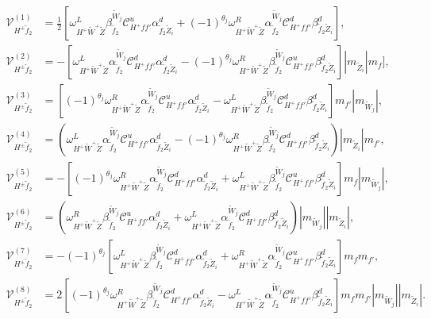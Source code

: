 \documentclass[final,3p,times]{elsarticle}
\begin{document}
\begin{align}
\mathcal{V}_{H^{\pm} \tilde{f}_2}^{(1)} &= \frac{1}{2}[\omega_{H^+ \tilde{W}^+ \tilde{Z}}^L \beta_{\tilde{f}_2}^{\tilde{W}_j} \mathcal{C}_{H^+ f f'}^u \alpha_{\tilde{f}_2 \tilde{Z}_i}^{d} + (-1)^{\theta_j} \omega_{H^+ \tilde{W}^+ \tilde{Z}}^R \alpha_{\tilde{f}_2}^{\tilde{W}_j} \mathcal{C}_{H^+ f f'}^d \beta_{\tilde{f}_2 \tilde{Z}_i}^{d}], \\
\mathcal{V}_{H^{\pm} \tilde{f}_2}^{(2)} &= -[\omega_{H^+ \tilde{W}^+ \tilde{Z}}^L \alpha_{\tilde{f}_2}^{\tilde{W}_j} \mathcal{C}_{H^+ f f'}^d \alpha_{\tilde{f}_2 \tilde{Z}_i}^{d} - (-1)^{\theta_j} \omega_{H^+ \tilde{W}^+ \tilde{Z}}^R \beta_{\tilde{f}_2}^{\tilde{W}_j} \mathcal{C}_{H^+ f f'}^u \beta_{\tilde{f}_2 \tilde{Z}_i}^{d}]|m_{\tilde{Z}_i}| m_{f}], \\
\mathcal{V}_{H^{\pm} \tilde{f}_2}^{(3)} &= [(-1)^{\theta_j}\omega_{H^+ \tilde{W}^+ \tilde{Z}}^R \alpha_{\tilde{f}_2}^{\tilde{W}_j} \mathcal{C}_{H^+ f f'}^u \alpha_{\tilde{f}_2 \tilde{Z}_i}^{d} -  \omega_{H^+ \tilde{W}^+ \tilde{Z}}^L \beta_{\tilde{f}_2}^{\tilde{W}_j} \mathcal{C}_{H^+ f f'}^d \beta_{\tilde{f}_2 \tilde{Z}_i}^{d}]m_{f'}|m_{\tilde{W}_j}|, \\
\mathcal{V}_{H^{\pm} \tilde{f}_2}^{(4)} &= (\omega_{H^+ \tilde{W}^+ \tilde{Z}}^L \alpha_{\tilde{f}_2}^{\tilde{W}_j} \mathcal{C}_{H^+ f f'}^u \alpha_{\tilde{f}_2 \tilde{Z}_i}^{d} - (-1)^{\theta_j} \omega_{H^+ \tilde{W}^+ \tilde{Z}}^R \beta_{\tilde{f}_2}^{\tilde{W}_j} \mathcal{C}_{H^+ f f'}^d \beta_{\tilde{f}_2 \tilde{Z}_i}^{d})|m_{\tilde{Z}_i}|m_{f'}, \\
\mathcal{V}_{H^{\pm} \tilde{f}_2}^{(5)} &= -[(-1)^{\theta_j}\omega_{H^+ \tilde{W}^+ \tilde{Z}}^R \alpha_{\tilde{f}_2}^{\tilde{W}_j} \mathcal{C}_{H^+ f f'}^d \alpha_{\tilde{f}_2 \tilde{Z}_i}^{d} + \omega_{H^+ \tilde{W}^+ \tilde{Z}}^L \beta_{\tilde{f}_2}^{\tilde{W}_j} \mathcal{C}_{H^+ f f'}^u \beta_{\tilde{f}_2 \tilde{Z}_i}^{d}]m_{f}|m_{\tilde{W}_j}|, \\
\mathcal{V}_{H^{\pm} \tilde{f}_2}^{(6)} &= (\omega_{H^+ \tilde{W}^+ \tilde{Z}}^R \beta_{\tilde{f}_2}^{\tilde{W}_j} \mathcal{C}_{H^+ f f'}^u \alpha_{\tilde{f}_2 \tilde{Z}_i}^{d} +  \omega_{H^+ \tilde{W}^+ \tilde{Z}}^L \alpha_{\tilde{f}_2}^{\tilde{W}_j} \mathcal{C}_{H^+ f f'}^d \beta_{\tilde{f}_2 \tilde{Z}_i}^{d})|m_{\tilde{W}_j}||m_{\tilde{Z}_i}|, \\
\mathcal{V}_{H^{\pm} \tilde{f}_2}^{(7)} &= -(-1)^{\theta_j}[\omega_{H^+ \tilde{W}^+ \tilde{Z}}^L \beta_{\tilde{f}_2}^{\tilde{W}_j} \mathcal{C}_{H^+ f f'}^d \alpha_{\tilde{f}_2 \tilde{Z}_i}^{d} + \omega_{H^+ \tilde{W}^+ \tilde{Z}}^R \alpha_{\tilde{f}_2}^{\tilde{W}_j} \mathcal{C}_{H^+ f f'}^u \beta_{\tilde{f}_2 \tilde{Z}_i}^{d}]m_{f}m_{f'}, \\
\mathcal{V}_{H^{\pm} \tilde{f}_2}^{(8)} &= 2[(-1)^{\theta_j}\omega_{H^+ \tilde{W}^+ \tilde{Z}}^R \beta_{\tilde{f}_2}^{\tilde{W}_j} \mathcal{C}_{H^+ f f'}^d \alpha_{\tilde{f}_2 \tilde{Z}_i}^{d} - \omega_{H^+ \tilde{W}^+ \tilde{Z}}^L \alpha_{\tilde{f}_2}^{\tilde{W}_j} \mathcal{C}_{H^+ f f'}^u \beta_{\tilde{f}_2 \tilde{Z}_i}^{d}]m_{f}m_{f'}|m_{\tilde{W}_j}||m_{\tilde{Z}_i}|.
\end{align}
\end{document}
